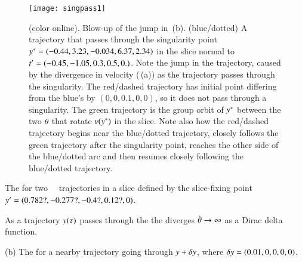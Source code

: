  \begin{figure}
 \begin{center}
\texttt{[image: singpass1]}
 \end{center}
 \caption{\label{fig:singpass}
(color online).
Blow-up of the jump in \,(b).
(blue/dotted) A trajectory that passes through the singularity point
$y^*=(-0.44, 3.23, -0.034, 6.37, 2.34)$ in the slice normal to
$t'_{}=(-0.45, -1.05, 0.3, 0.5, 0.)$.
Note the jump in the trajectory,  caused by the divergence in
velocity (\,(a)) as the trajectory
passes through the singularity. The red/dashed trajectory has initial
point differing from the blue's by $(0,0,0.1,0,0)$, so it does not pass
through a singularity. The green trajectory is the group orbit of
$y^*$ between the two ${\bf \theta}$ that rotate $v(y^*)$ in the
slice. Note also how the red/dashed trajectory begins near the
blue/dotted trajectory, closely follows the green trajectory after the
singularity point, reaches the other side of the blue/dotted arc and then
resumes closely following the blue/dotted trajectory.
 }%
 \end{figure}



The {\groupVel} for two \cLf\
\reducedsp\ trajectories in a slice defined by the slice-fixing
point ${y'}=(0.782?,-0.277?,-0.4?,0.12?,0)$.

As a trajectory $y(\tau)$ passes through the
{\sset} 
the {\groupVel} diverges
$\dot{{\bf \theta}} \to \infty$ as a Dirac delta function.

(b) The {\groupVel} for a nearby trajectory going
through $y+\delta y$,
where $\delta y=(0.01,0,0,0,0)$.




%
